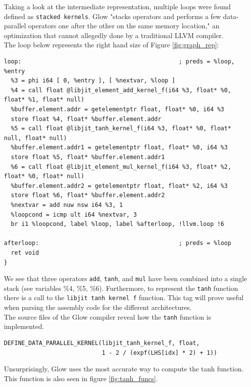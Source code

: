 \documentclass[twocolumn]{article}
\newcommand{\cc}[1]{\texttt{#1}}
\begin{document}
 Taking a look at the intermediate representation, multiple loops were found defined as \cc{stacked kernels}. Glow "stacks operators and performs a few data-parallel operators one after the other on the same memory location,"\cite{rotem2018glow} an optimization that cannot allegedly done by a traditional LLVM compiler.\\ 

The loop below represents the right hand size of Figure \ref{fig:graph_rep}:

\newpage

\begin{lstlisting}[basicstyle=\Footnotesize]
loop:                                             ; preds = %loop, %entry
  %3 = phi i64 [ 0, %entry ], [ %nextvar, %loop ]
  %4 = call float @libjit_element_add_kernel_f(i64 %3, float* %0, float* %1, float* null)
  %buffer.element.addr = getelementptr float, float* %0, i64 %3
  store float %4, float* %buffer.element.addr
  %5 = call float @libjit_tanh_kernel_f(i64 %3, float* %0, float* null, float* null)
  %buffer.element.addr1 = getelementptr float, float* %0, i64 %3
  store float %5, float* %buffer.element.addr1
  %6 = call float @libjit_element_mul_kernel_f(i64 %3, float* %2, float* %0, float* null)
  %buffer.element.addr2 = getelementptr float, float* %2, i64 %3
  store float %6, float* %buffer.element.addr2
  %nextvar = add nuw nsw i64 %3, 1
  %loopcond = icmp ult i64 %nextvar, 3
  br i1 %loopcond, label %loop, label %afterloop, !llvm.loop !6

afterloop:                                        ; preds = %loop
  ret void
}
\end{lstlisting}

We see that three operators \cc{add}, \cc{tanh}, and \cc{mul} have been combined into a single stack (see variables \%4, \%5, \%6). Furthermore, to represent the \cc{tanh} function there is a call to the \cc{libjit tanh kernel f} function. This tag will prove useful when parsing the assembly code for the different architectures.\\

The source files of the Glow compiler reveal how the \cc{tanh} function is implemented.

\begin{lstlisting}
DEFINE_DATA_PARALLEL_KERNEL(libjit_tanh_kernel_f, float,
                            1 - 2 / (expf(LHS[idx] * 2) + 1))
\end{lstlisting}

Unsurprisingly, Glow uses the most accurate way to compute the tanh function. This function is also seen in figure \ref{fig:tanh_funcs}.
\end{document}
